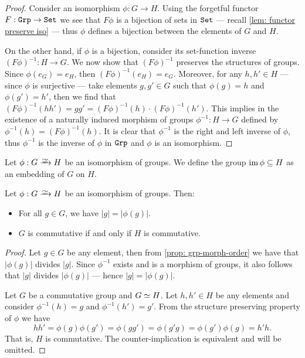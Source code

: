 \begin{proof}
    Consider an isomorphism \(\phi: G \to H\). Using the forgetful functor \(F:
    {\texttt{Grp}} \to {\texttt{Set}}\) we see that \(F\phi\) is a bijection of sets in \({\texttt{Set}}\) ---
    recall \cref{lem: functor preserve iso} --- thus \(\phi\) defines a bijection
    between the elements of \(G\) and \(H\).

    On the other hand, if \(\phi\) is a bijection, consider its set-function
    inverse \({(F\phi)}^{-1}: H \to G\). We now show that \({(F\phi)}^{-1}\) preserves
    the structures of groups. Since \(\phi(e_G) = e_H\), then \({(F\phi)}^{-1}(e_H)
    = e_G\). Moreover, for any \(h, h' \in H\) --- since \(\phi\) is surjective
    --- take elements \(g, g' \in G\) such that \(\phi(g) = h\) and \(\phi(g') =
    h'\), then we find that \({(F\phi)}^{-1}(hh') = g g' = {(F\phi)}^{-1}(h) \cdot
    {(F\phi)}^{-1}(h')\). This implies in the existence of a naturally induced
    morphism of groups \(\phi^{-1}: H \to G\) defined by \(\phi^{-1}(h) =
    {(F\phi)}^{-1}(h)\). It is clear that \(\phi^{-1}\) is the right and left
    inverse of \(\phi\), thus \(\phi^{-1}\) is the inverse of \(\phi\) in \({\texttt{Grp}}\)
    and \(\phi\) is an isomorphism.
\end{proof}

\begin{definition}[Embedding]
    \label{def:grp-embedding}
    Let \(\phi: G \isoto H\) be an isomorphism of groups. We define the group \(\operatorname{im}
    \phi \subseteq H\) as an embedding of \(G\) on \(H\).
\end{definition}

\begin{proposition}\label{prop: iso-order-com}
    Let \(\phi: G \isoto H\) be an isomorphism of groups. Then:
    \begin{itemize}
        \setlength\itemsep{0em}
        \item For all \(g \in G\), we have \(|g| = |\phi(g)|\).
        \item \(G\) is commutative if and only if \(H\) is commutative.
    \end{itemize}
\end{proposition}

\begin{proof}
    Let \(g \in G\) be any element, then from \cref{prop: grp-morph-order} we have
    that \(|\phi(g)|\) divides \(|g|\). Since \(\phi^{-1}\) exists and is a
    morphism of groups, it also follows that \(|g|\) divides \(|\phi(g)|\) ---
    hence \(|g| = |\phi(g)|\).

    Let \(G\) be a commutative group and \(G \simeq H\). Let \(h, h' \in H\) be any
    elements and consider \(\phi^{-1}(h) = g\) and \(\phi^{-1}(h') = g'\). From
    the structure preserving property of \(\phi\) we have
    \[
        h h' = \phi(g) \phi(g') = \phi(gg') = \phi(g'g) = \phi(g')\phi(g) = h' h.
    \]
    That is, \(H\) is commutative. The counter-implication is equivalent and will
    be omitted.
\end{proof}


